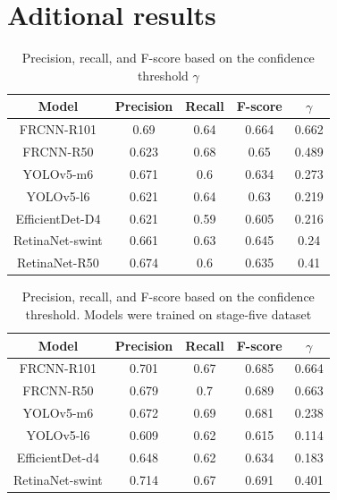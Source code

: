 \appendix



\chapter{Aditional results}

\begin{table}[H]
    \begin{tabular}{|c||c|c|c|c|}
        \hline
        Model           & Precision & Recall & F-score & $\gamma$ \\ \hline
        FRCNN-R101      & 0.69      & 0.64   & 0.664   & 0.662    \\ \hline
        FRCNN-R50       & 0.623     & 0.68   & 0.65    & 0.489    \\ \hline
        YOLOv5-m6       & 0.671     & 0.6    & 0.634   & 0.273    \\ \hline
        YOLOv5-l6       & 0.621     & 0.64   & 0.63    & 0.219    \\ \hline
        EfficientDet-D4 & 0.621     & 0.59   & 0.605   & 0.216    \\ \hline
        RetinaNet-swint & 0.661     & 0.63   & 0.645   & 0.24     \\ \hline
        RetinaNet-R50   & 0.674     & 0.6    & 0.635   & 0.41     \\ \hline
    \end{tabular}
    \caption{Precision, recall, and F-score based on the confidence threshold $\gamma$}
    \label{tab:model_prf:stage_four}
\end{table}


\begin{table}[H]
    \begin{tabular}{|c|c|c|c|c|}
        \hline
        Model           & Precision & Recall & F-score & $\gamma$ \\ \hline
        FRCNN-R101      & 0.701     & 0.67   & 0.685   & 0.664    \\ \hline
        FRCNN-R50       & 0.679     & 0.7    & 0.689   & 0.663    \\ \hline
        YOLOv5-m6       & 0.672     & 0.69   & 0.681   & 0.238    \\ \hline
        YOLOv5-l6       & 0.609     & 0.62   & 0.615   & 0.114    \\ \hline
        EfficientDet-d4 & 0.648     & 0.62   & 0.634   & 0.183    \\ \hline
        RetinaNet-swint & 0.714     & 0.67   & 0.691   & 0.401    \\ \hline
    \end{tabular}
    \caption{Precision, recall, and F-score based on the confidence threshold. Models were trained on stage-five dataset}
    \label{tab:model_prf:stage_five}
\end{table}


